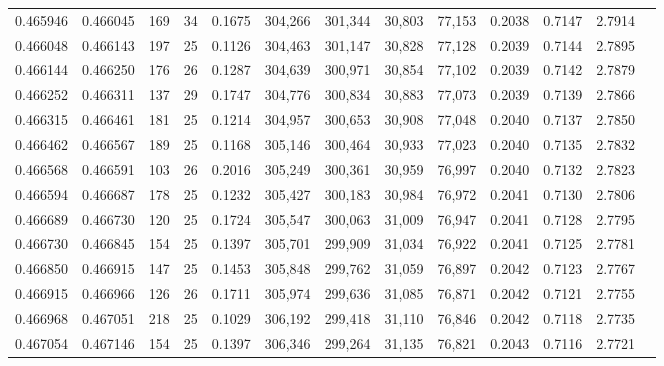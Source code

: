 \begin{tabular}{rrrrrrrrrrrrr}
0.465946 & 0.466045 & 169 &  34 &                                     0.1675 & 304,266 & 301,344 &  30,803 &  77,153 & 0.2038 & 0.7147 & 2.7914 \\
0.466048 & 0.466143 & 197 &  25 &                                     0.1126 & 304,463 & 301,147 &  30,828 &  77,128 & 0.2039 & 0.7144 & 2.7895 \\
0.466144 & 0.466250 & 176 &  26 &                                     0.1287 & 304,639 & 300,971 &  30,854 &  77,102 & 0.2039 & 0.7142 & 2.7879 \\
0.466252 & 0.466311 & 137 &  29 &                                     0.1747 & 304,776 & 300,834 &  30,883 &  77,073 & 0.2039 & 0.7139 & 2.7866 \\
0.466315 & 0.466461 & 181 &  25 &                                     0.1214 & 304,957 & 300,653 &  30,908 &  77,048 & 0.2040 & 0.7137 & 2.7850 \\
0.466462 & 0.466567 & 189 &  25 &                                     0.1168 & 305,146 & 300,464 &  30,933 &  77,023 & 0.2040 & 0.7135 & 2.7832 \\
0.466568 & 0.466591 & 103 &  26 &                                     0.2016 & 305,249 & 300,361 &  30,959 &  76,997 & 0.2040 & 0.7132 & 2.7823 \\
0.466594 & 0.466687 & 178 &  25 &                                     0.1232 & 305,427 & 300,183 &  30,984 &  76,972 & 0.2041 & 0.7130 & 2.7806 \\
0.466689 & 0.466730 & 120 &  25 &                                     0.1724 & 305,547 & 300,063 &  31,009 &  76,947 & 0.2041 & 0.7128 & 2.7795 \\
0.466730 & 0.466845 & 154 &  25 &                                     0.1397 & 305,701 & 299,909 &  31,034 &  76,922 & 0.2041 & 0.7125 & 2.7781 \\
0.466850 & 0.466915 & 147 &  25 &                                     0.1453 & 305,848 & 299,762 &  31,059 &  76,897 & 0.2042 & 0.7123 & 2.7767 \\
0.466915 & 0.466966 & 126 &  26 &                                     0.1711 & 305,974 & 299,636 &  31,085 &  76,871 & 0.2042 & 0.7121 & 2.7755 \\
0.466968 & 0.467051 & 218 &  25 &                                     0.1029 & 306,192 & 299,418 &  31,110 &  76,846 & 0.2042 & 0.7118 & 2.7735 \\
0.467054 & 0.467146 & 154 &  25 &                                     0.1397 & 306,346 & 299,264 &  31,135 &  76,821 & 0.2043 & 0.7116 & 2.7721 \\

\end{tabular}
